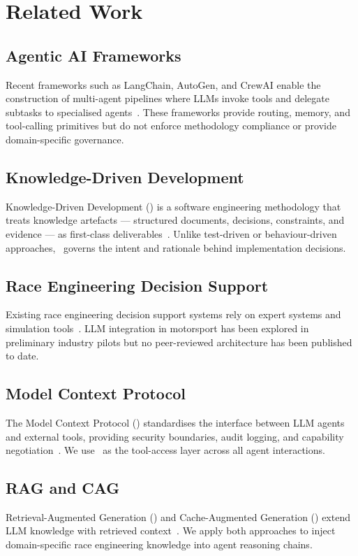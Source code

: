\section{Related Work}
\label{sec:related-work}

\subsection{Agentic AI Frameworks}

Recent frameworks such as LangChain, AutoGen, and CrewAI enable the construction
of multi-agent pipelines where LLMs invoke tools and delegate subtasks to
specialised agents~\cite{langchain2023,autogen2023}. These frameworks provide
routing, memory, and tool-calling primitives but do not enforce methodology
compliance or provide domain-specific governance.

\subsection{Knowledge-Driven Development}

Knowledge-Driven Development (\kdd) is a software engineering methodology that
treats knowledge artefacts --- structured documents, decisions, constraints, and
evidence --- as first-class deliverables~\cite{kdd2024}. Unlike test-driven or
behaviour-driven approaches, \kdd~governs the intent and rationale behind
implementation decisions.

\subsection{Race Engineering Decision Support}

Existing race engineering decision support systems rely on expert systems and
simulation tools~\cite{race-eng-2021}. LLM integration in motorsport has been
explored in preliminary industry pilots but no peer-reviewed architecture has
been published to date.

\subsection{Model Context Protocol}

The Model Context Protocol (\mcp) standardises the interface between LLM agents
and external tools, providing security boundaries, audit logging, and capability
negotiation~\cite{mcp2024}. We use \mcp~as the tool-access layer across all
agent interactions.

\subsection{RAG and CAG}

Retrieval-Augmented Generation (\rag) and Cache-Augmented Generation (\cag)
extend LLM knowledge with retrieved context~\cite{rag2020,cag2024}. We apply
both approaches to inject domain-specific race engineering knowledge into
agent reasoning chains.
